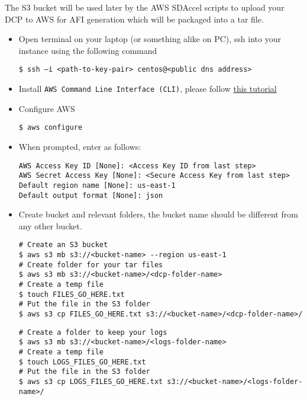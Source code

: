 \documentclass[]{article}
\begin{document}
The S3 bucket will be used later by the AWS SDAccel scripts to upload
your DCP to AWS for AFI generation which will be packaged into a tar
file.

\begin{itemize}
\item
  Open terminal on your laptop (or something alike on PC), ssh into your
  instance using the following command

\begin{verbatim}
$ ssh –i <path-to-key-pair> centos@<public dns address>
\end{verbatim}
\end{itemize}

\begin{itemize}
\item
  Install \texttt{AWS\ Command\ Line\ Interface\ (CLI)}, please follow
  \href{http://docs.aws.amazon.com/cli/latest/userguide/installing.html}{this
  tutorial}
\item
  Configure AWS

\begin{verbatim}
$ aws configure
\end{verbatim}
\end{itemize}

\begin{itemize}
\item
  When prompted, enter as follows:

\begin{verbatim}
AWS Access Key ID [None]: <Access Key ID from last step>
AWS Secret Access Key [None]: <Secure Access Key from last step>
Default region name [None]: us-east-1
Default output format [None]: json
\end{verbatim}
\end{itemize}

\begin{itemize}
\item
  Create bucket and relevant folders, the bucket name should be
  different from any other bucket.

\begin{verbatim}
# Create an S3 bucket 
$ aws s3 mb s3://<bucket-name> --region us-east-1
# Create folder for your tar files
$ aws s3 mb s3://<bucket-name>/<dcp-folder-name> 
# Create a temp file
$ touch FILES_GO_HERE.txt    
# Put the file in the S3 folder
$ aws s3 cp FILES_GO_HERE.txt s3://<bucket-name>/<dcp-folder-name>/  
\end{verbatim}

\begin{verbatim}
# Create a folder to keep your logs
$ aws s3 mb s3://<bucket-name>/<logs-folder-name>  
# Create a temp file
$ touch LOGS_FILES_GO_HERE.txt    
# Put the file in the S3 folder
$ aws s3 cp LOGS_FILES_GO_HERE.txt s3://<bucket-name>/<logs-folder-name>/  
\end{verbatim}
\end{itemize}
\end{document}
